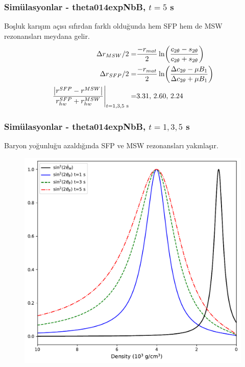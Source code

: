 \documentclass[10pt]{beamer}
\begin{document}
\begin{frame}
    \frametitle{Simülasyonlar - theta014expNbB, $t=5$ s}
    Boşluk karışım açısı sıfırdan farklı olduğunda hem SFP hem de MSW rezonansları meydana gelir.
    \begin{align*}
        \Delta r_{MSW}/2 =& \frac{-r_{mat}}{2} \ln(\frac{c_{2\theta} - s_{2\theta}}{c_{2\theta} + s_{2\theta}}) \\
        \Delta r_{SFP}/2 =& \frac{-r_{mat}}{2} \ln(\frac{\Delta c_{2\theta}-\mu B_{1}}{\Delta c_{2\theta}+\mu B_{1}}) \\
        \eval{\frac{\abs{r^{SFP} - r^{MSW}}}{r^{SFP}_{hw}+r^{MSW}_{hw}}}_{t=1,3,5 \text{ s}} =& 3.31\text{, } 2.60\text{, } 2.24
    \end{align*}
\end{frame}

\begin{frame}[noframenumbering]
    \frametitle{Simülasyonlar - theta014expNbB, $t=1,3,5$ s}
    Baryon yoğunluğu azaldığında SFP ve MSW rezonansları yakınlaşır.
    \begin{figure}[hbt!]
        \centering
        \includegraphics[width=.7\textwidth]{fig/widthCompare3_nbInverted_40MeV_IH_t135s_sqr_croped.pdf}
    \end{figure}
\end{frame}
\end{document}

